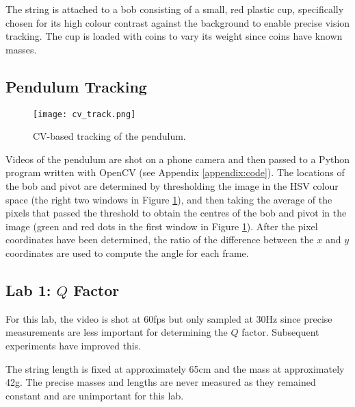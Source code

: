 \documentclass[aps,twocolumn,secnumarabic,nobalancelastpage,amsmath,amssymb,nofootinbib,floatfix,letterpaper]{revtex4}
\begin{document}
The string is attached to a bob consisting of a small, red plastic cup, specifically chosen for its high colour contrast
against the background to enable precise vision tracking. The cup is loaded with coins to vary its weight since coins
have known masses.

\subsection{Pendulum Tracking}
\label{sec:tracking}

\begin{figure}[htb]
    \texttt{[image: cv\_track.png]}
    \caption{CV-based tracking of the pendulum.}
    \label{fig:tracking}
\end{figure}

Videos of the pendulum are shot on a phone camera and then passed to a Python program written with OpenCV (see Appendix
\ref{appendix:code}). The locations of the bob and pivot are determined by thresholding the image in the HSV colour
space (the right two windows in Figure \ref{fig:tracking}), and then taking the average of the pixels that passed the
threshold to obtain the centres of the bob and pivot in the image (green and red dots in the first window in Figure
\ref{fig:tracking}). After the pixel coordinates have been determined, the ratio of the difference between the \(x\) and
\(y\) coordinates are used to compute the angle for each frame.

\subsection{Lab 1: \texorpdfstring{\(Q\)}{Q} Factor}
\label{sec:lab1_method}

For this lab, the video is shot at 60fps but only sampled at 30Hz since precise measurements are less important for
determining the \(Q\) factor. Subsequent experiments have improved this.

The string length is fixed at approximately 65cm and the mass at approximately 42g. The precise masses and lengths are
never measured as they remained constant and are unimportant for this lab.
\end{document}
